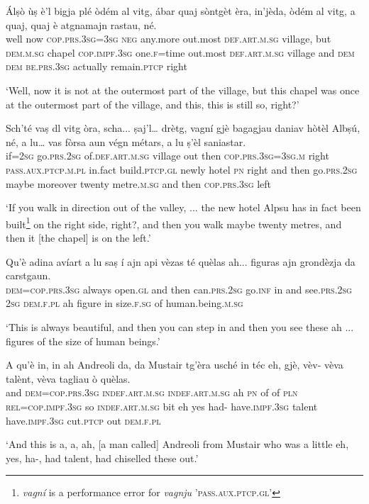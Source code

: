 \begin{linenumbers}
\gll  Álṣò ùṣ è’l bigja plé òdém al vitg, ábar quaj sòntgèt èra, in’jèda, òdém al vitg, a quaj, quaj è atgnamajn rastau, né.  \\
well now  \textsc{cop.prs.3sg=3sg} \textsc{neg} any.more out.most \textsc{def.art.m.sg} village, but  \textsc{dem.m.sg} chapel  \textsc{cop.impf.3sg} one.\textsc{f}=time out.most \textsc{def.art.m.sg} village and \textsc{dem} \textsc{dem} \textsc{be.prs.3sg} actually remain.\textsc{ptcp} right\\
\end{linenumbers}
\medskip
\glt `Well, now it is not at the outermost part of the village, but this chapel was once at the outermost part of the village, and this, this is still so, right?'
\medskip

\begin{linenumbers}
\gll  Sch’té vaṣ dl vitg òra, scha... ṣaj’l… drètg, vagní gjè bagagjau daniav hòtèl Albṣú, né, a lu… vas fòrsa aun végn métars, a lu ṣ’èl saniastar.\\
if=\textsc{2sg} go.\textsc{prs.2sg} of.\textsc{def.art.m.sg} village out then \textsc{cop.prs.3sg=3sg.m} right  \textsc{pass.aux.ptcp.m.pl} in.fact build.\textsc{ptcp.gl} newly hotel \textsc{pn} right and then go.\textsc{prs.2sg} maybe moreover twenty metre.\textsc{m.sg} and then  \textsc{cop.prs.3sg} left   \\
\end{linenumbers}
\medskip
\glt `If you walk in direction out of the valley, ... the new hotel Alpsu has in fact been built\footnote{\textit{vagní} is a performance error for \textit{vagnju} '\textsc{pass.aux.ptcp.gl}'} on the right side, right?, and then you walk maybe twenty metres, and then it [the chapel] is on the left.'
\medskip

\begin{linenumbers}
\gll  Qu’è adina avíart a lu saṣ í ajn api vèzas té quèlas ah... figuras ajn grondèzja da carstgaun.  \\
 \textsc{dem=cop.prs.3sg} always open.\textsc{gl} and then can.\textsc{prs.2sg} go.\textsc{inf} in and see.\textsc{prs.2sg} \textsc{2sg} \textsc{dem.f.pl} ah figure in size.\textsc{f.sg} of human.being.\textsc{m.sg} \\
\end{linenumbers}
\medskip
\glt `This is always beautiful, and then you can step in and then you see these ah ... figures of the size of human beings.'
\medskip

\begin{linenumbers}
\gll   A qu’è in, in ah  Andreoli da, da Mustair tg’èra usché in téc eh, gjè, vèv- vèva talènt, vèva tagliau ò quèlas. \\
and \textsc{dem=cop.prs.3sg} \textsc{indef.art.m.sg} \textsc{indef.art.m.sg} ah \textsc{pn} of of  \textsc{pln} \textsc{rel=cop.impf.3sg} so  \textsc{indef.art.m.sg} bit  eh yes had-  have.\textsc{impf.3sg} talent have.\textsc{impf.3sg} cut.\textsc{ptcp} out  \textsc{dem.f.pl}\\
\end{linenumbers}
\medskip
\glt `And this is a, a, ah, [a man called] Andreoli from Mustair who was a little eh, yes, ha-, had talent, had chiselled these out.'
\medskip

